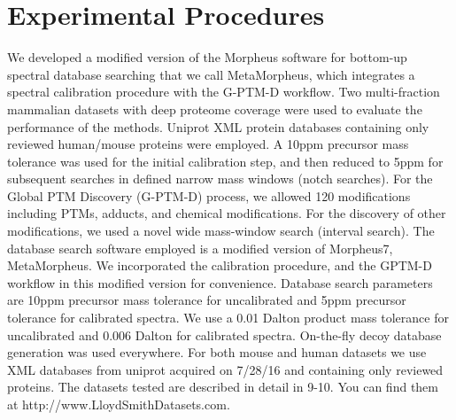 \documentclass[journal=jprobs,manuscript=article]{achemso}
\begin{document}
\section{Experimental Procedures}
We developed a modified version of the Morpheus software for bottom-up spectral database searching that we call MetaMorpheus, which integrates a spectral calibration procedure with the G-PTM-D workflow. Two multi-fraction mammalian datasets with deep proteome coverage were used to evaluate the performance of the methods. Uniprot XML protein databases containing only reviewed human/mouse proteins were employed. A 10ppm precursor mass tolerance was used for the initial calibration step, and then reduced to 5ppm for subsequent searches in defined narrow mass windows (notch searches). For the Global PTM Discovery (G-PTM-D) process, we allowed 120 modifications including PTMs, adducts, and chemical modifications. For the discovery of other modifications, we used a novel wide mass-window search (interval search).
The database search software employed is a modified version of Morpheus7, MetaMorpheus. We incorporated the calibration procedure, and the GPTM-D workflow in this modified version for convenience.
Database search parameters are 10ppm precursor mass tolerance for uncalibrated and 5ppm precursor tolerance for calibrated spectra. We use a 0.01 Dalton product mass tolerance for uncalibrated and 0.006 Dalton for calibrated spectra. On-the-fly decoy database generation was used everywhere.
For both mouse and human datasets we use XML databases from uniprot acquired on 7/28/16 and containing only reviewed proteins. 
The datasets tested are described in detail in 9-10. You can find them at http://www.LloydSmithDatasets.com.
\end{document}

